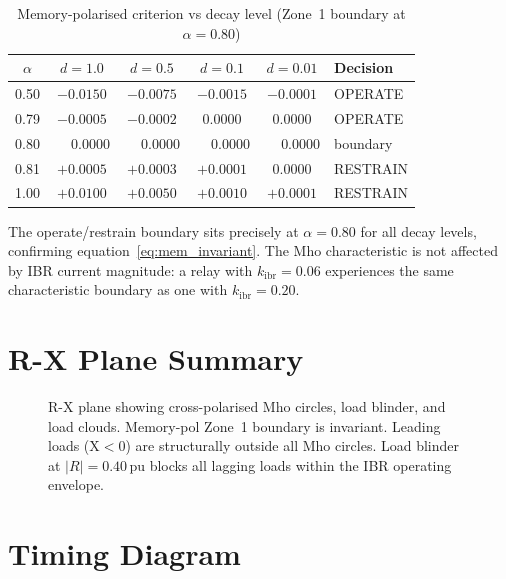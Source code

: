 \documentclass[11pt,a4paper]{article}
\begin{document}
\begin{table}[h]
\centering
\caption{Memory-polarised criterion vs decay level (Zone~1 boundary at $\alpha=0.80$)}
\label{tab:criterion}
\begin{tabular}{@{}cccccl@{}}
\toprule
$\alpha$ & $d=1.0$ & $d=0.5$ & $d=0.1$ & $d=0.01$ & Decision \\
\midrule
0.50 & $-0.0150$ & $-0.0075$ & $-0.0015$ & $-0.0001$ & \cellcolor{green!20}OPERATE \\
0.79 & $-0.0005$ & $-0.0002$ & $0.0000$ & $0.0000$   & \cellcolor{green!20}OPERATE \\
0.80 & $\phantom{-}0.0000$ & $\phantom{-}0.0000$ & $\phantom{-}0.0000$ & $\phantom{-}0.0000$ & boundary \\
0.81 & $+0.0005$ & $+0.0003$ & $+0.0001$ & $0.0000$  & \cellcolor{red!15}RESTRAIN \\
1.00 & $+0.0100$ & $+0.0050$ & $+0.0010$ & $+0.0001$ & \cellcolor{red!15}RESTRAIN \\
\bottomrule
\end{tabular}
\end{table}

The operate/restrain boundary sits precisely at $\alpha=0.80$ for all decay
levels, confirming equation~\eqref{eq:mem_invariant}.  The Mho characteristic is
not affected by IBR current magnitude: a relay with $k_\mathrm{ibr}=0.06$
experiences the same characteristic boundary as one with $k_\mathrm{ibr}=0.20$.

\section{R-X Plane Summary}
\label{sec:rxplane}

\begin{figure}[h!]
\centering
\caption{%
  R-X plane showing cross-polarised Mho circles, load blinder, and load clouds.
  Memory-pol Zone~1 boundary is invariant.  Leading loads (X$<$0) are
  structurally outside all Mho circles.  Load blinder at $|R|=0.40$\,pu blocks
  all lagging loads within the IBR operating envelope.}
\label{fig:rxplane}

\end{figure}

\section{Timing Diagram}
\label{sec:timing_diag}
\end{document}
